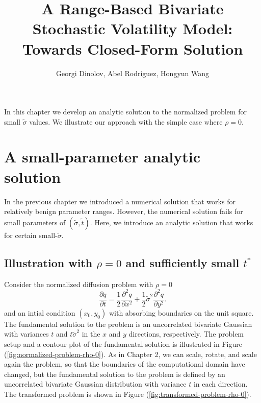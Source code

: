 \documentclass[10pt]{article}
\title{A Range-Based Bivariate Stochastic Volatility Model: Towards Closed-Form Solution}
\author{Georgi Dinolov, Abel Rodriguez, Hongyun Wang}
\date{} %
\begin{document}
\def\spacingset#1{\renewcommand{\baselinestretch}%
{#1}\small\normalsize} \spacingset{1}

\bigskip

\vspace{1cm}

In this chapter we develop an analytic solution to the normalized
problem for small $\tilde{\sigma}$ values. We illustrate our approach
with the simple case where $\rho=0$.

\section{A small-parameter analytic solution}
In the previous chapter we introduced a numerical solution that works
for relatively benign parameter ranges. However, the numerical
solution fails for small parameters of $(\tilde{\sigma},
\tilde{t})$. Here, we introduce an analytic solution that works for
certain small-$\tilde{\sigma}$.

\subsection{Illustration with $\rho=0$ and sufficiently small
  $t^{*}$}
Consider the normalized diffusion problem with $\rho=0$
\begin{equation}
  \frac{\partial q}{\partial t} = \frac{1}{2}\frac{\partial^2 q}{\partial x^2} + \frac{1}{2}\tilde{\sigma}^2 \frac{\partial^2 q}{\partial y^2}. \label{eq:standard-diffusion}
\end{equation}
and an intial condition $(x_0, y_0)$ with absorbing boundaries on the
unit square. The fundamental solution to the problem is an
uncorrelated bivariate Gaussian with variances $t$ and
$t\tilde{\sigma}^2$ in the $x$ and $y$ directions, respectively. The
problem setup and a contour plot of the fundamental solution is
illustrated in Figure (\ref{fig:normalized-problem-rho-0}). As in
Chapter 2, we can scale, rotate, and scale again the problem, so that
the boundaries of the computational domain have changed, but the
fundamental solution to the problem is defined by an uncorrelated
bivariate Gaussian distribution with variance $t$ in each
direction. The transformed problem is shown in Figure
(\ref{fig:transformed-problem-rho-0}).
\end{document}
